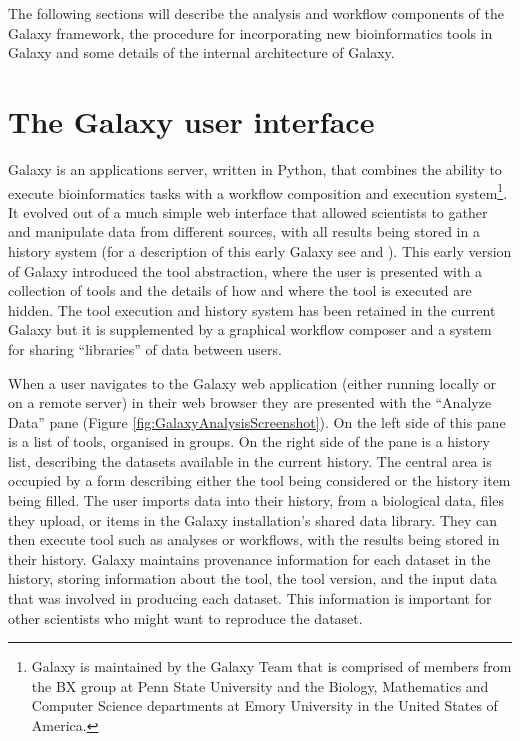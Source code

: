 \documentclass[a4paper,10pt]{scrreprt}
\begin{document}
The following sections will describe the analysis and workflow components of the Galaxy framework, the procedure for incorporating new bioinformatics tools in Galaxy and some details of the internal architecture of Galaxy.

\section{The Galaxy user interface}

Galaxy is an applications server, written in Python, that combines the ability to execute bioinformatics tasks with a workflow composition and execution system\footnote{Galaxy is maintained by the Galaxy Team that is comprised of members from the BX group at Penn State University and the Biology, Mathematics and Computer Science departments at Emory University in the United States of America.}. It evolved out of a much simple web interface that allowed scientists to gather and manipulate data from different sources, with all results being stored in a history system (for a description of this early Galaxy see \cite{giardine_galaxy:_2005} and \cite{nekrutenko_introduction_2011}). This early version of Galaxy introduced the tool abstraction, where the user is presented with a collection of tools and the details of how and where the tool is executed are hidden. The tool execution and history system has been retained in the current Galaxy but it is supplemented by a graphical workflow composer and a system for 
sharing ``libraries'' of data between users.

When a user navigates to the Galaxy web application (either running locally or on a remote server) in their web browser they are presented with the ``Analyze Data'' pane (Figure \ref{fig:GalaxyAnalysisScreenshot}). On the left side of this pane is a list of tools, organised in groups. On the right side of the pane is a history list, describing the datasets available in the current history. The central area is occupied by a form describing either the tool being considered or the history item being filled. The user imports data into their history, from a biological data, files they upload, or items in the Galaxy installation's shared data library. They can then execute tool such as analyses or workflows, with the results being stored in their history. Galaxy maintains provenance information for each dataset in the history, storing information about the tool, the tool version, and the input data that was involved in producing each dataset. This information is important for other scientists who might want to 
reproduce the dataset.
\end{document}
